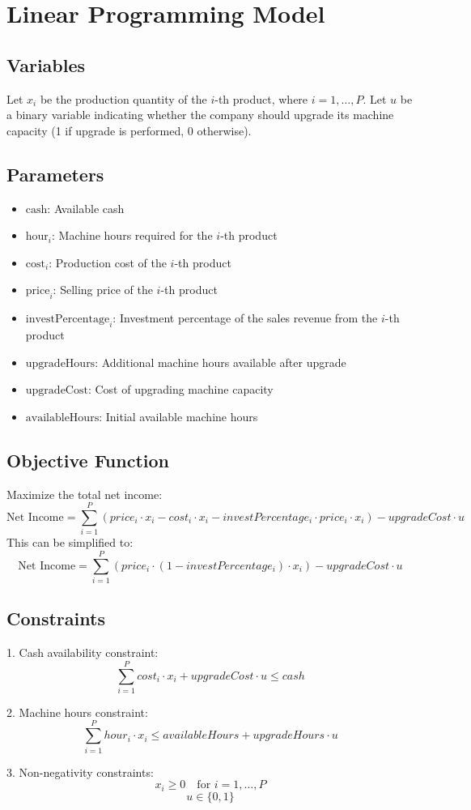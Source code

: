 \documentclass{article}
\begin{document}
\section*{Linear Programming Model}

\subsection*{Variables}
Let \( x_i \) be the production quantity of the \( i \)-th product, where \( i = 1, \ldots, P \).  
Let \( u \) be a binary variable indicating whether the company should upgrade its machine capacity (1 if upgrade is performed, 0 otherwise).

\subsection*{Parameters}
\begin{itemize}
    \item \( \text{cash} \): Available cash
    \item \( \text{hour}_i \): Machine hours required for the \( i \)-th product
    \item \( \text{cost}_i \): Production cost of the \( i \)-th product
    \item \( \text{price}_i \): Selling price of the \( i \)-th product
    \item \( \text{investPercentage}_i \): Investment percentage of the sales revenue from the \( i \)-th product
    \item \( \text{upgradeHours} \): Additional machine hours available after upgrade
    \item \( \text{upgradeCost} \): Cost of upgrading machine capacity
    \item \( \text{availableHours} \): Initial available machine hours
\end{itemize}

\subsection*{Objective Function}
Maximize the total net income:
\[
\text{Net Income} = \sum_{i=1}^{P} (price_i \cdot x_i - cost_i \cdot x_i - investPercentage_i \cdot price_i \cdot x_i) - upgradeCost \cdot u
\]
This can be simplified to:
\[
\text{Net Income} = \sum_{i=1}^{P} (price_i \cdot (1 - investPercentage_i) \cdot x_i) - upgradeCost \cdot u
\]

\subsection*{Constraints}
1. Cash availability constraint:
\[
\sum_{i=1}^{P} cost_i \cdot x_i + upgradeCost \cdot u \leq cash
\]

2. Machine hours constraint:
\[
\sum_{i=1}^{P} hour_i \cdot x_i \leq availableHours + upgradeHours \cdot u
\]

3. Non-negativity constraints:
\[
x_i \geq 0 \quad \text{for } i = 1, \ldots, P
\]
\[
u \in \{0, 1\}
\]
\end{document}
